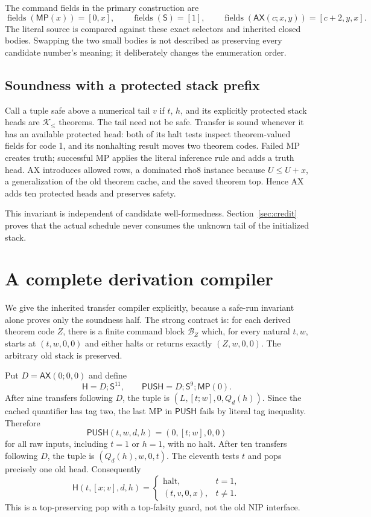 \documentclass[11pt]{article}
\newcommand{\AX}{\mathsf{AX}}
\newcommand{\MP}{\mathsf{MP}}
\newcommand{\SSS}{\mathsf S}
\newcommand{\PushBlock}{\mathsf{PUSH}}
\newcommand{\PopBlock}{\mathsf H}
\newcommand{\Kdom}{\mathcal K_{\le}}
\begin{document}
The command fields in the primary construction are
\[
 \operatorname{fields}(\MP(x))=[0,x],\qquad
 \operatorname{fields}(\SSS)=[1],\qquad
 \operatorname{fields}(\AX(c;x,y))=[c+2,y,x].                    \tag{4}
\]
The literal source is compared against these exact selectors and inherited closed bodies. Swapping the two small bodies is not described as preserving every candidate number's meaning; it deliberately changes the enumeration order.

\subsection{Soundness with a protected stack prefix}

Call a tuple safe above a numerical tail $v$ if $t$, $h$, and its explicitly protected stack heads are $\Kdom$ theorems. The tail need not be safe. Transfer is sound whenever it has an available protected head: both of its halt tests inspect theorem-valued fields for code 1, and its nonhalting result moves two theorem codes. Failed MP creates truth; successful MP applies the literal inference rule and adds a truth head. AX introduces allowed rows, a dominated rho8 instance because $U\le U+x$, a generalization of the old theorem cache, and the saved theorem top. Hence AX adds ten protected heads and preserves safety.

This invariant is independent of candidate well-formedness. Section~\ref{sec:credit} proves that the actual schedule never consumes the unknown tail of the initialized stack.

\section{A complete derivation compiler}
\label{sec:compiler}

We give the inherited transfer compiler explicitly, because a safe-run invariant alone proves only the soundness half. The strong contract is: for each derived theorem code $Z$, there is a finite command block $\mathcal B_Z$ which, for every natural $t,w$, starts at $(t,w,0,0)$ and either halts or returns exactly $(Z,w,0,0)$. The arbitrary old stack is preserved.

Put $D=\AX(0;0,0)$ and define
\[
 \PopBlock=D;\SSS^{11},\qquad
 \PushBlock=D;\SSS^9;\MP(0).
\]
After nine transfers following $D$, the tuple is
$(L,[t;w],0,Q_d(h))$. Since the cached quantifier has tag two, the last MP in $\PushBlock$ fails by literal tag inequality. Therefore
\[
 \PushBlock(t,w,d,h)=(0,[t;w],0,0)
\]
for all raw inputs, including $t=1$ or $h=1$, with no halt. After ten transfers following $D$, the tuple is $(Q_d(h),w,0,t)$. The eleventh tests $t$ and pops precisely one old head. Consequently
\[
 \PopBlock(t,[x;v],d,h)=
 \begin{cases}\mathrm{halt},&t=1,\\(t,v,0,x),&t\ne1.\end{cases}   \tag{5}
\]
This is a top-preserving pop with a top-falsity guard, not the old NIP interface.
\end{document}
